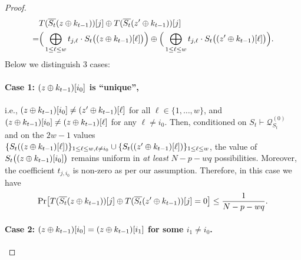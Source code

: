 \begin{proof}
	\begin{align*}
	&  T(\overline{S_t}(z\oplus k_{t-1}))[j]\oplus T(\overline{S_t}(z'\oplus k_{t-1}))[j]       \\
	= &
	\Big(\bigoplus_{1\leq\ell\leq w}t_{j,\ell}\cdot S_t\big((z\oplus k_{t-1})[\ell]\big)\Big)\oplus
	\Big(\bigoplus_{1\leq\ell\leq w}t_{j,\ell}\cdot S_t\big((z'\oplus k_{t-1})[\ell]\big)\Big)   .
	\end{align*}
	Below we distinguish 3 cases:
	
	
	
	
	
	\paragraph{Case 1: $(z\oplus k_{t-1})[i_0]$ is ``unique'',}
	
	i.e., $(z\oplus k_{t-1})[i_0]\neq(z'\oplus k_{t-1})[\ell]$ for all $\ell\in\{1,\ldots,w\}$, and $(z\oplus k_{t-1})[i_0]\neq(z\oplus k_{t-1})[\ell]$ for any $\ell\neq i_0$. Then, conditioned on $S_t\vdash\mathcal{Q}_{S_t}^{(0)}$ and on the $2w-1$ values $\{S_t((z\oplus k_{t-1})[\ell])\}_{1\leq \ell\leq w,\ell\neq i_0}\cup\{S_t((z'\oplus k_{t-1})[\ell])\}_{1\leq \ell\leq w}$, the value of $S_t\big((z\oplus k_{t-1})[i_0]\big)$ remains uniform in {\it at least} $N-p-wq$ possibilities. Moreover, the coefficient $t_{j,i_0}$ is non-zero as per our assumption. Therefore, in this case we have
	\begin{align}
	{\Pr}\big[T(\overline{S_t}(z\oplus k_{t-1}))[j]\oplus T(\overline{S_t}(z'\oplus k_{t-1}))[j]=0\big]\leq\frac{1}{N-p-wq}.
	\label{eq:bound-eq-B33}
	\end{align}
	
	
	\paragraph{Case 2: $(z\oplus k_{t-1})[i_0]=(z\oplus k_{t-1})[i_1]$ for some $i_1\neq i_0$.}
	

\end{proof}
